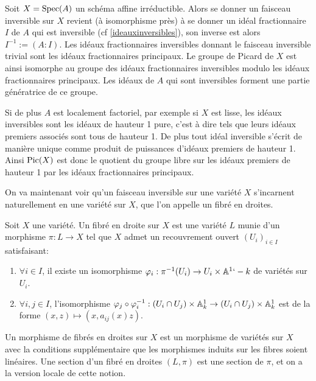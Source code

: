 \begin{ex}\label{expicaff}
Soit $X=\operatorname{Spec} (A)$ un schéma affine irréductible. Alors se donner un faisceau inversible sur $X$ revient (à isomorphisme près) à se donner un idéal fractionnaire $I$ de $A$ qui est inversible (cf \ref{ideauxinversibles}), son inverse est alors $I^{-1}:=(A:I)$. Les idéaux fractionnaires inversibles donnant le faisceau inversible trivial sont les idéaux fractionnaires principaux. Le groupe de Picard de $X$ est ainsi isomorphe au groupe des idéaux fractionnaires inversibles modulo les idéaux fractionnaires principaux. Les idéaux de $A$ qui sont inversibles forment une partie génératrice de ce groupe. 

Si de plus $A$ est localement factoriel, par exemple si $X$ est lisse, les idéaux inversibles sont les idéaux de hauteur 1 pure, c'est à dire tels que leurs idéaux premiers associés sont tous de hauteur 1. De plus tout idéal inversible s'écrit de manière unique comme produit de puissances d'idéaux premiers de hauteur 1. Ainsi $\operatorname{Pic}(X)$ est donc le quotient du groupe libre sur les idéaux premiers de hauteur 1 par les idéaux fractionnaires principaux.
\end{ex}

On va maintenant voir qu'un faisceau inversible sur une variété $X$ s'incarnent naturellement en une variété sur $X$, que l'on appelle un fibré en droites.

\begin{defn}\label{linebundle}
Soit $X$ une variété. Un fibré en droite sur $X$ est une variété $L$ munie d'un morphisme $\pi:L\rightarrow X$ tel que $X$ admet un recouvrement ouvert $(U_i)_{i\in I}$ satisfaisant:

\begin{enumerate}
\item $\forall i\in I$, il existe un isomorphisme $\varphi_i :\pi^{-1}(U_i)\rightarrow U_i\times\mathbb{A}^1`-k$ de variétés sur $U_i$.
\item $\forall i, j\in I$, l'isomorphisme $\varphi_j\circ \varphi_i^{-1}: (U_i\cap U_j)\times \mathbb{A}^1_k\rightarrow (U_i\cap U_j)\times \mathbb{A}^1_k$ est de la forme $(x, z)\mapsto (x, a_{ij}(x)z)$.
\end{enumerate}
Un morphisme de fibrés en droites sur $X$ est un morphisme de variétés sur $X$ avec la conditions supplémentaire que les morphismes induits sur les fibres soient linéaires.
Une section d'un fibré en droites $(L, \pi)$ est une section de $\pi$, et on a la version locale de cette notion.
\end{defn}

